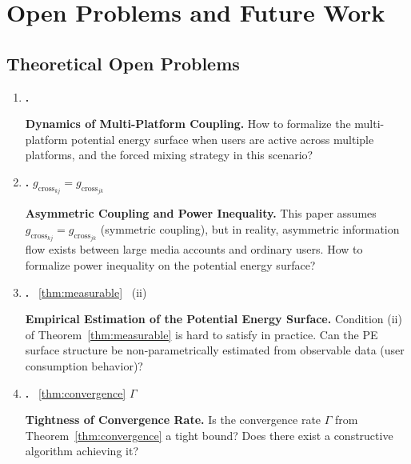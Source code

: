 \documentclass[11pt,a4paper]{article}
\theoremstyle{remark}
\newcommand{\GCoupling}{g_{\text{cross}}}
\begin{document}
\section{}
\section{Open Problems and Future Work}

\subsection{}

\subsection{Theoretical Open Problems}

\begin{enumerate}[label=OP\arabic*:, leftmargin=*]
\item \textbf{.}



\smallskip

\textbf{Dynamics of Multi-Platform Coupling.}
How to formalize the multi-platform potential energy surface when users are active
across multiple platforms, and the forced mixing strategy in this scenario?

\medskip
\item \textbf{.}
 $\GCoupling_{kj} = \GCoupling_{jk}$


\smallskip

\textbf{Asymmetric Coupling and Power Inequality.}
This paper assumes $\GCoupling_{kj} = \GCoupling_{jk}$ (symmetric coupling), but in
reality, asymmetric information flow exists between large media accounts and ordinary
users. How to formalize power inequality on the potential energy surface?

\medskip
\item \textbf{.}
~\ref{thm:measurable} ~(ii) 

\smallskip

\textbf{Empirical Estimation of the Potential Energy Surface.}
Condition (ii) of Theorem~\ref{thm:measurable} is hard to satisfy in practice.
Can the PE surface structure be non-parametrically estimated from observable data
(user consumption behavior)?

\medskip
\item \textbf{.}
~\ref{thm:convergence}  $\Gamma$ 

\smallskip

\textbf{Tightness of Convergence Rate.}
Is the convergence rate $\Gamma$ from Theorem~\ref{thm:convergence} a tight bound?
Does there exist a constructive algorithm achieving it?
\end{enumerate}
\end{document}
